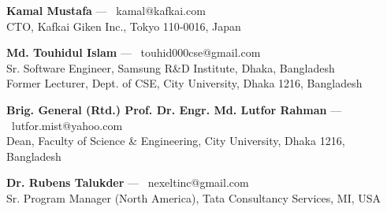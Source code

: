 
\begin{cvlistsection}


\item \textbf{Kamal Mustafa} — \faEnvelope\ \textcolor{Cerulean}{kamal@kafkai.com}\\
CTO, Kafkai Giken Inc., Tokyo 110‑0016, Japan

\item \textbf{Md. Touhidul Islam} — \faEnvelope\ \textcolor{Cerulean}{touhid000cse@gmail.com}\\
Sr. Software Engineer, Samsung R\&D Institute, Dhaka, Bangladesh\\
Former Lecturer, Dept. of CSE, City University, Dhaka 1216, Bangladesh

\item \textbf{Brig. General (Rtd.) Prof. Dr. Engr. Md. Lutfor Rahman} — \faEnvelope\ \textcolor{Cerulean}{lutfor.mist@yahoo.com}\\ 
Dean, Faculty of Science \& Engineering, City University, Dhaka 1216, Bangladesh

\item \textbf{Dr. Rubens Talukder} — \faEnvelope\ \textcolor{Cerulean}{nexeltinc@gmail.com}\\
Sr. Program Manager (North America), Tata Consultancy Services, MI, USA

\end{cvlistsection}
